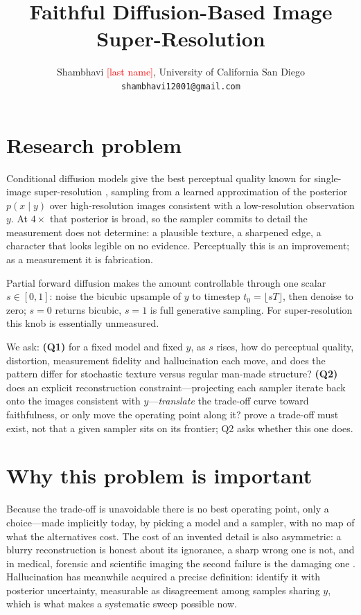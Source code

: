 \documentclass{article}
\title{Faithful Diffusion-Based Image Super-Resolution}
\author{%
  Shambhavi \textcolor{red}{[last name]}, University of California San Diego\\
  \texttt{shambhavi12001@gmail.com}
}
\begin{document}
\maketitle

\section{Research problem}

Conditional diffusion models give the best perceptual quality known for
single-image super-resolution \citep{saharia2023sr3}, sampling from a learned
approximation of the posterior $p(x \mid y)$ over high-resolution images
consistent with a low-resolution observation $y$. At $4\times$ that posterior
is broad, so the sampler commits to detail the measurement does not determine:
a plausible texture, a sharpened edge, a character that looks legible on no
evidence. Perceptually this is an improvement; as a measurement it is
fabrication.

Partial forward diffusion \citep{meng2022sdedit} makes the amount controllable
through one scalar $s \in [0,1]$: noise the bicubic upsample of $y$ to timestep
$t_0 = \lfloor sT \rfloor$, then denoise to zero; $s=0$ returns bicubic, $s=1$ is full
generative sampling. For super-resolution this knob
is essentially unmeasured.

We ask: \textbf{(Q1)} for a fixed model and fixed $y$, as $s$ rises, how do
perceptual quality, distortion, measurement fidelity and hallucination each
move, and does the pattern differ for stochastic texture versus regular
man-made structure? \textbf{(Q2)} does an explicit reconstruction
constraint---projecting each sampler iterate back onto the images consistent
with $y$---\emph{translate} the trade-off curve toward faithfulness, or only
move the operating point along it? \citet{blau2018perception} prove a trade-off
must exist, not that a given sampler sits on its frontier; Q2 asks whether this
one does.

\section{Why this problem is important}

Because the trade-off is unavoidable \citep{blau2018perception} there is no
best operating point, only a choice---made implicitly today,
by picking a model and a sampler, with no map of what the alternatives cost.
The cost of an invented detail is also asymmetric: a blurry reconstruction is
honest about its ignorance, a sharp wrong one is not, and in medical, forensic
and scientific imaging the second failure is the damaging one
\citep{tivnan2024hallucination}. Hallucination has meanwhile acquired a precise
definition: \citet{cohen2024looks} identify it with posterior uncertainty,
measurable as disagreement among samples sharing $y$, which is what makes a
systematic sweep possible now.
\end{document}

